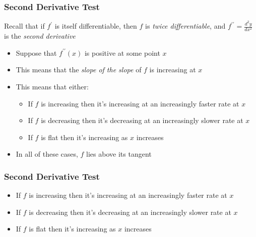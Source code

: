 \documentclass{beamer}
\numberwithin{equation}{section}
\begin{document}
\begin{frame}
\frametitle{Second Derivative Test}

Recall that if $f^\prime$ is itself differentiable, then $f$ is \textit{twice differentiable}, and $f^{\prime\prime} = \frac{d^2y}{dx^2}$ is the \textit{second derivative} \pause

\begin{itemize}
\item Suppose that $f^{\prime\prime}(x)$ is positive at some point $x$ \pause
\item This means that the \textit{slope of the slope} of $f$ is increasing at $x$ \pause
\item This means that either:

\begin{itemize}

\item If $f$ is increasing then it's increasing at an increasingly faster rate at $x$ \pause
\item If $f$ is decreasing then it's decreasing at an increasingly slower rate at $x$ \pause
\item If $f$ is flat then it's increasing as $x$ increases \pause

\end{itemize}
\item In all of these cases, $f$ lies above its tangent
\end{itemize}

\end{frame}



\begin{frame}
\frametitle{Second Derivative Test}

\begin{itemize}

\item[A] If $f$ is increasing then it's increasing at an increasingly faster rate at $x$ \pause
\item[B] If $f$ is decreasing then it's decreasing at an increasingly slower rate at $x$ \pause
\item[C] If $f$ is flat then it's increasing as $x$ increases

\end{itemize}

\vspace{.2in}
\begin{center}
\end{center}

\end{frame}
\end{document}

